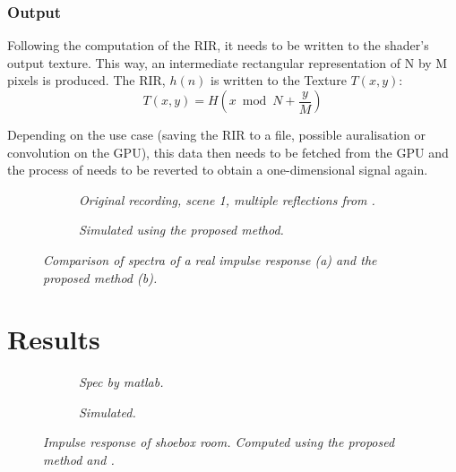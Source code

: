 \documentclass[twoside,a4paper]{article}
\begin{document}
\subsubsection*{Output}
Following the computation of the RIR, it needs to be written to the shader's output texture. This way, an intermediate rectangular representation of N by M pixels is produced. The RIR, $h(n)$ is written to the Texture $T(x,y)$:
\begin{equation}
  T(x,y) = H(x \bmod N+\frac{y}{M})
\end{equation}

Depending on the use case (saving the RIR to a file, possible auralisation or convolution on the GPU), this data then needs to be fetched from the GPU and the process of needs to be reverted to obtain a one-dimensional signal again.


\begin{figure}[ht]
    \center
    \begin{subfigure}[t]{0.45\textwidth}
      \centering
      
    \caption{\label{fig:fig:multReflSpecOrig} \it Original recording, scene 1, multiple reflections from \cite{brinkmann_round_2019}. }
    \end{subfigure}%
    \begin{subfigure}[t]{0.45\textwidth}
      \centering
      
      \caption{\label{fig:multReflSpecSim} \it Simulated using the proposed method. }
    \end{subfigure}
    \caption{\it Comparison of spectra of a real impulse response (a) and the proposed method (b).}
    \label{fig:multReflSpecCompare}
\end{figure}


\section{Results}

\begin{figure}[ht]
    \center
    \begin{subfigure}[t]{0.45\textwidth}
      \centering
      
    \caption{\label{fig:shoe} \it Spec by matlab. }
    \end{subfigure}%
    \begin{subfigure}[t]{0.45\textwidth}
      \centering
      
      \caption{\label{fig:shoe} \it Simulated. }
    \end{subfigure}
    \caption{\it Impulse response of shoebox room. Computed using the proposed method and \cite{lehmann_fast_2020}.}
    \label{fig:test}
\end{figure}
\end{document}
